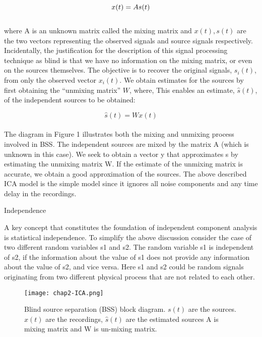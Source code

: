 \begin{compactitem}
\begin{equation}
\label{eq:ica-linear}
\\
x(t) = As(t)
\end{equation}\\

where A is an unknown matrix called the mixing matrix
and $x(t), s(t)$ are the two vectors representing the observed
signals and source signals respectively. Incidentally, the
justification for the description of this signal processing
technique as blind is that we have no information on the
mixing matrix, or even on the sources themselves.
The objective is to recover the original signals, $s_i(t)$,
from only the observed vector $x_i(t)$. We obtain estimates
for the sources by first obtaining the “unmixing matrix” $W$,
where, 
This enables an estimate, $\hat{s}(t)$, of the independent
sources to be obtained:

\begin{equation}
\label{eq:ica-white}
\hat{s}(t) =Wx(t)
\end{equation}\\

The diagram in Figure 1 illustrates both the mixing
and unmixing process involved in BSS. The independent
sources are mixed by the matrix A (which is unknown in
this case). We seek to obtain a vector y that approximates
s by estimating the unmixing matrix W. If the estimate of
the unmixing matrix is accurate, we obtain a good approximation
of the sources.
The above described ICA model is the simple model
since it ignores all noise components and any time delay
in the recordings.
\item {Independence}

A key concept that constitutes the foundation of independent
component analysis is statistical independence. To
simplify the above discussion consider the case of two different
random variables s1 and s2. The random variable s1
is independent of s2, if the information about the value of
s1 does not provide any information about the value of s2,
and vice versa. Here s1 and s2 could be random signals
originating from two different physical process that are not
related to each other.

\begin{figure}[ht]
  \centering
    \texttt{[image: chap2-ICA.png]}
  \caption{Blind source separation (BSS) block diagram. $s(t)$ are the sources. $x(t)$ are the recordings,
	$\hat{s}(t)$ are the estimated sources A is mixing matrix and W is un-mixing matrix. }
  \label{fig:chap2-ICA}
\end{figure}


\end{compactitem}
